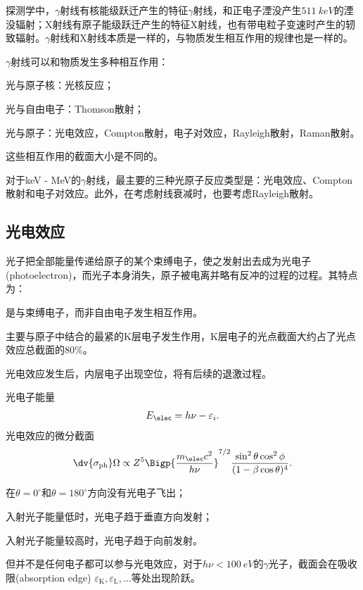 探测学中，$\gamma$射线有核能级跃迁产生的特征$\gamma$射线，和正电子湮没产生$\SI{511}{keV}$的湮没辐射；X射线有原子能级跃迁产生的特征X射线，也有带电粒子变速时产生的轫致辐射。$\gamma$射线和X射线本质是一样的，与物质发生相互作用的规律也是一样的。

$\gamma$射线可以和物质发生多种相互作用：
\begin{compactitem}
	\item 光与原子核：光核反应；
	\item 光与自由电子：Thomson散射；
	\item 光与原子：光电效应，Compton散射，电子对效应，Rayleigh散射，Raman散射。
\end{compactitem}
这些相互作用的截面大小是不同的。

对于keV - MeV的$\gamma$射线，最主要的三种光原子反应类型是：光电效应、Compton散射和电子对效应。此外，在考虑射线衰减时，也要考虑Rayleigh散射。

\subsection{光电效应}

光子把全部能量传递给原子的某个束缚电子，使之发射出去成为光电子(photoelectron)，而光子本身消失，原子被电离并略有反冲的过程的过程。其特点为：
\begin{compactenum}
	\item 是与束缚电子，而非自由电子发生相互作用。
	\item 主要与原子中结合的最紧的K层电子发生作用，K层电子的光点截面大约占了光点效应总截面的80\%。
	\item 光电效应发生后，内层电子出现空位，将有后续的退激过程。
\end{compactenum}
光电子能量 
\[
	E_\elec=h\nu-\varepsilon_i.
\]
光电效应的微分截面
\[
	\dv{\sigma_{\mathrm{ph}}}\Omega\propto Z^5\Bigp{\frac{m_\elec c^2}{h\nu}}^{7/2}\frac{\sin^2\theta\cos^2\phi}{(1-\beta\cos\theta)^4}.
\]
\begin{compactenum}
	\item 在$\theta=0^\circ$和$\theta=180^\circ$方向没有光电子飞出；
	\item 入射光子能量低时，光电子趋于垂直方向发射；
	\item 入射光子能量较高时，光电子趋于向前发射。
\end{compactenum}

但并不是任何电子都可以参与光电效应，对于$h\nu<\SI{100}{eV}$的$\gamma$光子，截面会在吸收限(absorption edge) $\varepsilon_\mathrm K,\varepsilon_\mathrm L,\ldots$等处出现阶跃。

